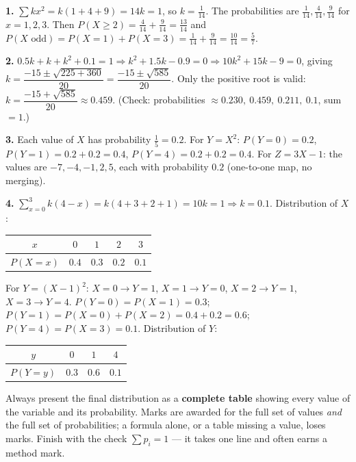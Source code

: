 \documentclass[11pt]{article}
\begin{document}
\begin{corrige}[Exercise 1]
\textbf{1.} $\sum kx^2 = k(1 + 4 + 9) = 14k = 1$, so $k = \tfrac{1}{14}$. The probabilities are $\tfrac{1}{14}, \tfrac{4}{14}, \tfrac{9}{14}$ for $x = 1, 2, 3$. Then $P(X \geq 2) = \tfrac{4}{14} + \tfrac{9}{14} = \tfrac{13}{14}$ and $P(X \text{ odd}) = P(X=1) + P(X=3) = \tfrac{1}{14} + \tfrac{9}{14} = \tfrac{10}{14} = \tfrac{5}{7}$.
\par
\textbf{2.} $0.5k + k + k^2 + 0.1 = 1 \Rightarrow k^2 + 1.5k - 0.9 = 0 \Rightarrow 10k^2 + 15k - 9 = 0$, giving $k = \dfrac{-15 \pm \sqrt{225 + 360}}{20} = \dfrac{-15 \pm \sqrt{585}}{20}$. Only the positive root is valid: $k = \dfrac{-15 + \sqrt{585}}{20} \approx 0.459$. (Check: probabilities $\approx 0.230,\ 0.459,\ 0.211,\ 0.1$, sum $= 1$.)
\par
\textbf{3.} Each value of $X$ has probability $\tfrac15 = 0.2$. For $Y = X^2$: $P(Y=0) = 0.2$, $P(Y=1) = 0.2 + 0.2 = 0.4$, $P(Y=4) = 0.2 + 0.2 = 0.4$. For $Z = 3X - 1$: the values are $-7, -4, -1, 2, 5$, each with probability $0.2$ (one-to-one map, no merging).
\par
\textbf{4.} $\sum_{x=0}^3 k(4-x) = k(4+3+2+1) = 10k = 1 \Rightarrow k = 0.1$. Distribution of $X$:
\begin{center}
\begin{tabular}{|c|cccc|}
\hline
\rowcolor{popblueL} $x$ & $0$ & $1$ & $2$ & $3$ \\ \hline
$P(X=x)$ & $0.4$ & $0.3$ & $0.2$ & $0.1$ \\ \hline
\end{tabular}
\end{center}
For $Y = (X-1)^2$: $X=0 \to Y=1$, $X=1 \to Y=0$, $X=2 \to Y=1$, $X=3 \to Y=4$.
$P(Y=0) = P(X=1) = 0.3$; $P(Y=1) = P(X=0)+P(X=2) = 0.4+0.2 = 0.6$; $P(Y=4) = P(X=3) = 0.1$.
Distribution of $Y$:
\begin{center}
\begin{tabular}{|c|ccc|}
\hline
\rowcolor{popblueL} $y$ & $0$ & $1$ & $4$ \\ \hline
$P(Y=y)$ & $0.3$ & $0.6$ & $0.1$ \\ \hline
\end{tabular}
\end{center}
\end{corrige}

\begin{attention}
Always present the final distribution as a \textbf{complete table} showing every value of the variable and its probability. Marks are awarded for the full set of values \emph{and} the full set of probabilities; a formula alone, or a table missing a value, loses marks. Finish with the check $\sum p_i = 1$ — it takes one line and often earns a method mark.
\end{attention}
\end{document}

